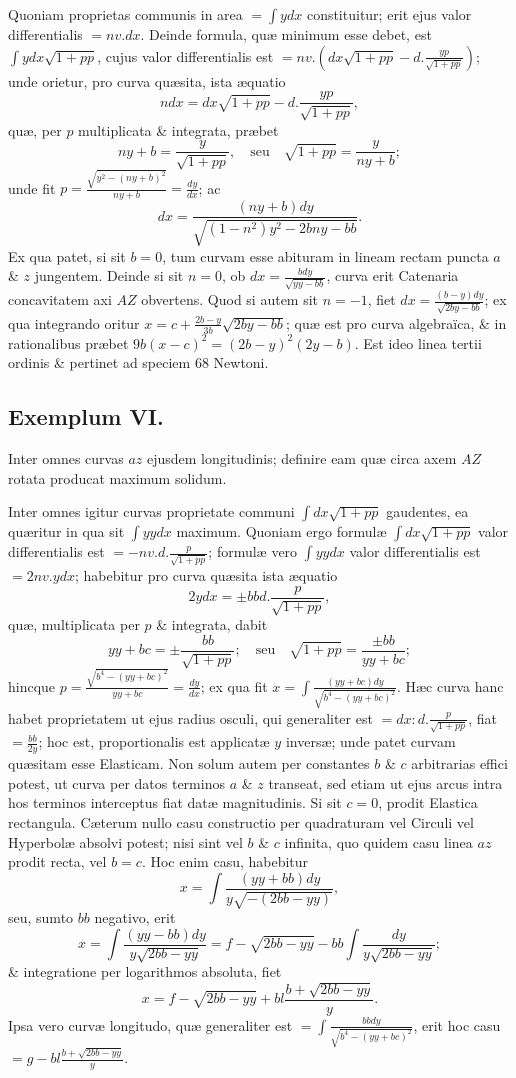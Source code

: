 Quoniam proprietas communis in area $=\int ydx$ constituitur; erit ejus valor differentialis $=nv.dx$. Deinde formula, quæ minimum esse debet, est $\int ydx\sqrt{1+pp}$, cujus valor differentialis est $=nv.\left(dx\sqrt{1+pp}-d.\frac{yp}{\sqrt{1+pp}}\right)$; unde orietur, pro curva quæsita, ista æquatio
\[ndx=dx\sqrt{1+pp}-d.\frac{yp}{\sqrt{1+pp}},\]
quæ, per $p$ multiplicata \& integrata, præbet
\[ny+b=\frac y{\sqrt{1+pp}},\quad\text{seu}\quad\sqrt{1+pp}=\frac y{ny+b};\]
unde fit $p=\frac{\sqrt{y^2-(ny+b)^2}}{ny+b}=\frac{dy}{dx}$; ac
\[dx=\frac{(ny+b)dy}{\sqrt{(1-n^2)y^2-2bny-bb}}.\]
Ex qua patet, si sit $b=0$, tum curvam esse abituram in lineam rectam puncta $a$ \& $z$ jungentem. Deinde si sit $n=0$, ob $dx=\frac{bdy}{\sqrt{yy-bb}}$, curva erit Catenaria concavitatem axi $AZ$ obvertens. Quod si autem sit $n=-1$, fiet $dx=\frac{(b-y)dy}{\sqrt{2by-bb}}$; ex qua integrando oritur $x=c+\frac{2b-y}{3b}\sqrt{2by-bb}$; quæ est pro curva algebraïca, \& in rationalibus præbet $9b(x-c)^2=(2b-y)^2(2y-b)$. Est ideo linea tertii ordinis \& pertinet ad speciem 68 Newtoni.

\subsection*{Exemplum VI.}
Inter omnes curvas $az$ ejusdem longitudinis; definire eam quæ circa axem $AZ$ rotata producat maximum solidum.

Inter omnes igitur curvas proprietate communi $\int dx\sqrt{1+pp}$ gaudentes, ea quæritur in qua sit $\int yydx$ maximum. Quoniam ergo formulæ $\int dx\sqrt{1+pp}$ valor differentialis est $=-nv.d.\frac p{\sqrt{1+pp}}$; formulæ vero $\int yydx$ valor differentialis est $=2nv.ydx$; habebitur pro curva quæsita ista æquatio
\[2ydx=\pm bbd.\frac p{\sqrt{1+pp}},\]
quæ, multiplicata per $p$ \& integrata, dabit
\[yy+bc=\pm\frac{bb}{\sqrt{1+pp}};\quad\text{seu}\quad\sqrt{1+pp}=\frac{\pm bb}{yy+bc};\]
hincque $p=\frac{\sqrt{b^4-(yy+bc)^2}}{yy+bc}=\frac{dy}{dx}$; ex qua fit $x=\int\frac{(yy+bc)dy}{\sqrt{b^4-(yy+bc)^2}}$. Hæc curva hanc habet proprietatem ut ejus radius osculi, qui generaliter est $=dx:d.\frac p{\sqrt{1+pp}}$, fiat $=\frac{bb}{2y}$; hoc est, proportionalis est applicatæ $y$ inversæ; unde patet curvam quæsitam esse Elasticam. Non solum autem per constantes $b$ \& $c$ arbitrarias effici potest, ut curva per datos terminos $a$ \& $z$ transeat, sed etiam ut ejus arcus intra hos terminos interceptus fiat datæ magnitudinis. Si sit $c=0$, prodit Elastica rectangula. Cæterum nullo casu constructio per quadraturam vel Circuli vel Hyperbolæ absolvi potest; nisi sint vel $b$ \& $c$ infinita, quo quidem casu linea $az$ prodit recta, vel $b=c$. Hoc enim casu, habebitur
\[x=\int\frac{(yy+bb)dy}{y\sqrt{-(2bb-yy)}},\]
seu, sumto $bb$ negativo, erit
\[
x=\int\frac{(yy-bb)dy}{y\sqrt{2bb-yy}}=f-\sqrt{2bb-yy}-bb\int\frac{dy}{y\sqrt{2bb-yy}};
\]
\& integratione per logarithmos absoluta, fiet
\[x=f-\sqrt{2bb-yy}+bl\frac{b+\sqrt{2bb-yy}}y.\]
Ipsa vero curvæ longitudo, quæ generaliter est $=\int\frac{bbdy}{\sqrt{b^4-(yy+bc)^2}}$, erit hoc casu $=g-bl\frac{b+\sqrt{2bb-yy}}y$.

